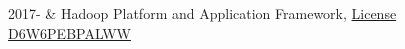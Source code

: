 \documentclass[]{cv-roald}
\begin{document}
\begin{tabularcv}
    2017-       &   
                    \newline Hadoop Platform and Application Framework, \href{https://www.coursera.org/account/accomplishments/verify/D6W6PEBPALWW}{License D6W6PEBPALWW}
\end{tabularcv}

\clearpage
\end{document}

